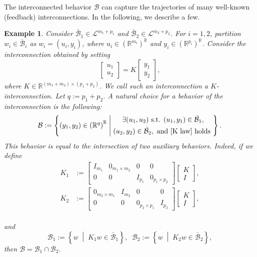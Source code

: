 \documentclass[letterpaper, 10 pt, conference]{ieeeconf}
\theoremstyle{ieeeconf}
\newtheorem{example}{Example}
\newcommand{\R}{\mathbb{R}}
\newcommand{\B}{\mathcal{B}}
\newcommand{\set}[2]{\left\{ #1 \;\middle| \; #2 \right\}}
\begin{document}
The interconnected behavior $\B$ can capture the trajectories of many well-known (feedback) interconnections. In the following, we describe a few.
\begin{example}
	Consider  $\bar{\B}_1\in \mathcal{L}^{m_1+p_1}$ and $\bar{\B}_2\in \mathcal{L}^{m_2+p_2}$. For $i=1,2$, partition ${w_i\in \bar{\B}_i}$ as ${w_i=(u_i,y_i)}$, where ${u_i\in \left(\R^{m_i}\right)^\R}$ and ${y_i\in \left(\R^{p_i}\right)^\R}$. Consider the interconnection obtained by setting
	\vspace{-1ex} \begin{equation}\begin{bmatrix}
			u_1 \\ u_2
		\end{bmatrix}=K\begin{bmatrix}
			y_1 \\ y_2
		\end{bmatrix},\label{K law}\end{equation} where ${K\in \R^{(m_1+m_2)\times(p_1+p_2)}}$. We call such an interconnection a \emph{$K$-interconnection}.
	Let $q:=p_1+p_2$. A natural choice for a behavior of the interconnection is the following:
	\[\B := \set{(y_1,y_2)\in \left(\R^{q}\right)^\R}{\begin{gathered}\exists (u_1,u_2) %
			\text{ s.t. } (u_1,y_1) \in \bar{\B}_1,\\ (u_2,y_2) \in \bar{\B}_2, \text{ and \eqref{K law} holds }\end{gathered}}.\]
	This behavior is equal to the intersection of two auxiliary behaviors. Indeed, if we define
	\begin{align}
		K_1&:=\begin{bmatrix}
			I_{m_1} & 0_{m_1 \times m_2} & 0 & 0 \\ 0 & 0 & I_{p_1} & 0_{p_1\times p_2}
		\end{bmatrix}\begin{bmatrix}
			K \\ I
		\end{bmatrix}, \label{K1} \\ K_2&:=\begin{bmatrix}
			0_{m_2 \times m_1} & I_{m_2} & 0 & 0 \\ 0 & 0 & 0_{p_2 \times p_1} & I_{p_2}
		\end{bmatrix}\begin{bmatrix}
			K \\ I
		\end{bmatrix},\label{K2}
	\end{align}
	\vspace{-2ex}\\
and
	\begin{equation}
		\B_1:=\set{w}{K_1w\in \bar{\B}_1}, \;\;
		\B_2:=\set{w}{K_2w\in \bar{\B}_2},
		\label{arbitrary sr barB}
	\end{equation} then $\B=\B_1\cap\B_2$.
	

\end{example}
\end{document}
